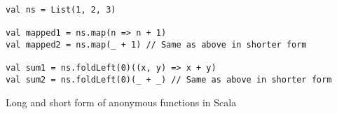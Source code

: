 \begin{algorithm}
\begin{verbatim}
val ns = List(1, 2, 3)

val mapped1 = ns.map(n => n + 1)
val mapped2 = ns.map(_ + 1) // Same as above in shorter form

val sum1 = ns.foldLeft(0)((x, y) => x + y)
val sum2 = ns.foldLeft(0)(_ + _) // Same as above in shorter form
\end{verbatim}

\caption{Long and short form of anonymous functions in Scala \label{scala:lambdas}}
\end{algorithm}
